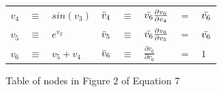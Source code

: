 \documentclass{article}
\begin{document}
\begin{figure}[h!]
\begin{floatrow}
{\begin{tabular}{|lcl|lclll|}
        $v_{4}$ & $\equiv$ & $sin(v_3)$ & $\Bar{v}_{4}$ & $\equiv$ & $\Bar{v_6}\frac{\partial{v_6}}{\partial{v_4}}$ & $=$ & $\Bar{v_6}$\\
        $v_{5}$ & $\equiv$ & $e^{v_2}$ & $\Bar{v}_{5}$ & $\equiv$ & $\Bar{v_6}\frac{\partial{v_6}}{\partial{v_5}}$ & $=$ & $\Bar{v_6}$\\
        \hline
        $v_{6}$ & $\equiv$ & $v_5 + v_4$ & $\Bar{v}_{6}$ & $\equiv$ & $\frac{\partial{v_6}}{\partial{v_6}}$ & $=$ & $1$\\
        \hline
    \end{tabular}
}{%
  \caption{Table of nodes in Figure 2 of Equation 7}%
}
\end{floatrow}
\end{figure}
\end{document}
